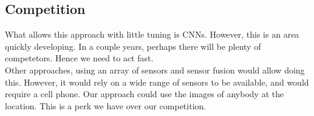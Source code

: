 \subsection{Competition}
What allows this approach with little tuning is CNNs. However, this is an area quickly developing. In a couple years, perhaps there will be plenty of competetors. Hence we need to act fast.\\

Other approaches, using an array of sensors and sensor fusion would allow doing this. However, it would rely on a wide range of sensors to be available, and would require a cell phone. Our approach could use the images of anybody at the location. This is a perk we have over our competition.

